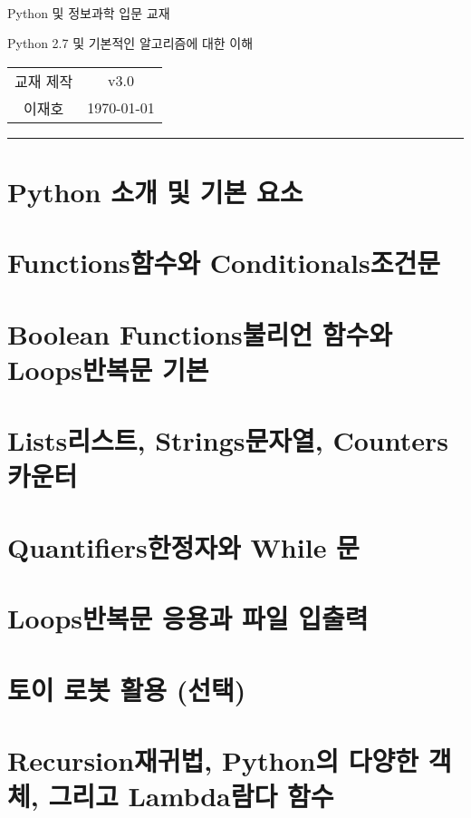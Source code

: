 \documentclass[a4paper, 10pt, twoside, calcwidth]{oblivoir}
\begin{document}
\begin{center}\sffamily
\text{ }\\[1cm]
\huge Python 및 정보과학 입문 교재

\vspace{.1cm}
\Large Python 2.7 및 기본적인 알고리즘에 대한 이해\\[.6cm]
	\begin{tabular} {c c}
		교재 제작 & v3.0\\
		이재호 & \today
	\end{tabular}
\end{center}
\vspace{.5cm}
\noindent\rule[0.5ex]{\linewidth}{.5pt}
\tableofcontents*
\pagebreak

\section{Python 소개 및 기본 요소}



\section{Functions함수와 Conditionals조건문}



\section{Boolean Functions불리언 함수와 Loops반복문 기본}



\section{Lists리스트, Strings문자열, Counters카운터}



\section{Quantifiers한정자와 While 문}



\section{Loops반복문 응용과 파일 입출력}



\section{토이 로봇 활용 (선택)}


\section{Recursion재귀법, Python의 다양한 객체, 그리고 Lambda람다 함수}


\section{}
\end{document}
